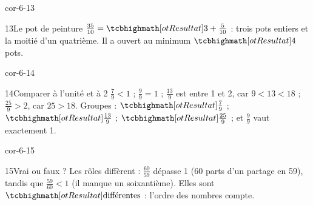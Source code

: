 \begin{blocLivre}{cor-6-13}\begin{corrige}{13}{Le pot de peinture}
$\frac{35}{10}=\res{3+\frac5{10}}$ : trois pots entiers et la moitié d’un quatrième. Il a ouvert au minimum $\res4$ pots.
\end{corrige}\end{blocLivre}
\begin{blocLivre}{cor-6-14}\begin{corrige}{14}{Comparer à l’unité et à 2}
$\frac79<1$ ; $\frac99=1$ ; $\frac{13}9$ est entre 1 et 2, car $9<13<18$ ; $\frac{25}9>2$, car $25>18$. Groupes : $\res{\frac79}$ ; $\res{\frac{13}9}$ ; $\res{\frac{25}9}$ ; et $\frac99$ vaut exactement 1.
\end{corrige}\end{blocLivre}
\begin{blocLivre}{cor-6-15}\begin{corrige}{15}{Vrai ou faux ?}
Les rôles diffèrent : $\frac{60}{59}$ dépasse 1 (60 parts d’un partage en 59), tandis que $\frac{59}{60}<1$ (il manque un soixantième). Elles sont $\res{\text{différentes}}$ : l’ordre des nombres compte.
\end{corrige}\end{blocLivre}
